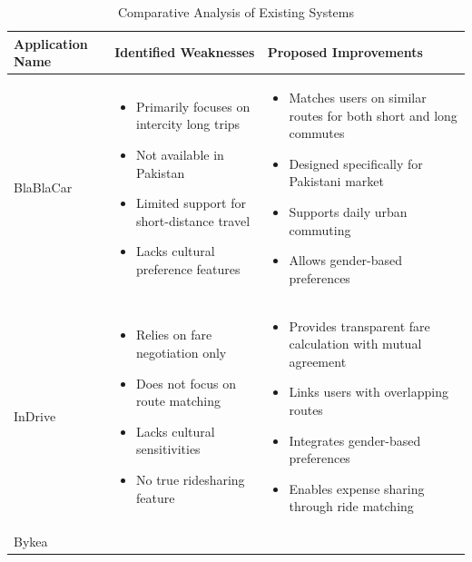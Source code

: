 \begin{table}[htbp]
\centering
\caption{Comparative Analysis of Existing Systems}
\renewcommand{\arraystretch}{1.3}

\begin{tabularx}{\textwidth}{|p{3cm}|X|X|}
\hline
\textbf{Application Name} & \textbf{Identified Weaknesses} & \textbf{Proposed Improvements} \\
\hline
BlaBlaCar &
\begin{itemize}[leftmargin=*, noitemsep, topsep=0pt]
    \item Primarily focuses on intercity long trips
    \item Not available in Pakistan
    \item Limited support for short-distance travel
    \item Lacks cultural preference features
\end{itemize}
&
\begin{itemize}[leftmargin=*, noitemsep, topsep=0pt]
    \item Matches users on similar routes for both short and long commutes
    \item Designed specifically for Pakistani market
    \item Supports daily urban commuting
    \item Allows gender-based preferences
\end{itemize}
\\
\hline
InDrive &
\begin{itemize}[leftmargin=*, noitemsep, topsep=0pt]
    \item Relies on fare negotiation only
    \item Does not focus on route matching
    \item Lacks cultural sensitivities
    \item No true ridesharing feature
\end{itemize}
&
\begin{itemize}[leftmargin=*, noitemsep, topsep=0pt]
    \item Provides transparent fare calculation with mutual agreement
    \item Links users with overlapping routes
    \item Integrates gender-based preferences
    \item Enables expense sharing through ride matching
\end{itemize}
\\
\hline
Bykea &
\begin{itemize}[leftmargin=*, noitemsep, topsep=0pt]

\end{itemize}
\end{tabularx}
\end{table}
